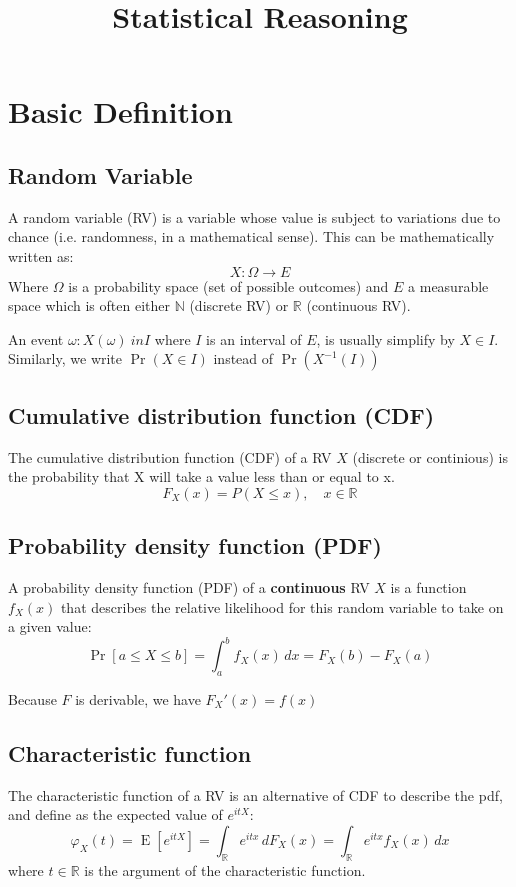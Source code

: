 \documentclass[twocolumn]{article}
\title{Statistical Reasoning}
\date{\vspace{-6ex}}
\numberwithin{equation}{section}
\begin{document}
\maketitle



\section{Basic Definition}

	\subsection{Random Variable}
A random variable (RV) is a variable whose value is subject to variations due to chance (i.e. randomness, in a mathematical sense). This can be mathematically written as:
$$X\colon \Omega \to E$$
Where  $\Omega$ is a probability space (set of possible outcomes) and $E$ a measurable space which is often either $\mathbb{N}$ (discrete RV) or $\mathbb{R}$ (continuous RV).

An event ${\omega \colon X(\omega) \ in I }$ where $I$ is an interval of $E$, is usually simplify by ${X \in I}$. Similarly, we write $\Pr(X \in I)$ instead of $\Pr(X^{-1}(I))$

	\subsection{Cumulative distribution function (CDF)}
The cumulative distribution function (CDF) of a RV $X$ (discrete or continious) is the probability that X will take a value less than or equal to x.
$$F_X(x) = P(X \le x), \quad x \in \mathbb{R}$$


	\subsection{Probability density function (PDF)}
A probability density function (PDF) of a  \textbf{continuous} RV $X$	is a function $f_X(x)$ that describes the relative likelihood for this random variable to take on a given value:
$$  \Pr [a \le X \le b] = \int_a^b f_X(x) \, dx = F_X(b) - F_X(a) $$

Because $F$ is derivable, we have $F_X'(x)=f(x)$

	\subsection{Characteristic function}
The characteristic function of a RV is an alternative of CDF to describe the pdf, and define as the expected value of $e^{itX}$:
$$ \varphi_X(t) = \operatorname{E} \left [ e^{itX} \right ] = \int_{\mathbb{R}} e^{itx}\,dF_X(x) = \int_{\mathbb{R}} e^{itx} f_X(x)\,dx$$
where  $t \in \mathbb{R}$ is the argument of the characteristic function.
 
\end{document}
